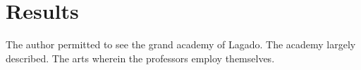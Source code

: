\section{Results}

The author permitted to see the grand academy of Lagado.  The academy largely described.  The arts wherein the professors employ themselves.

